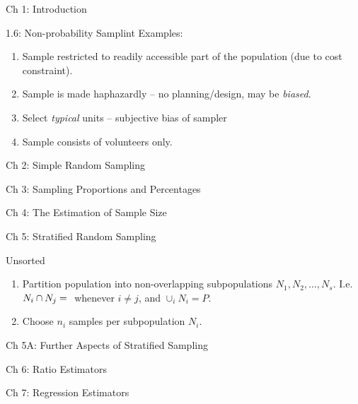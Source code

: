 \documentclass{article}
\begin{document}
\begin{section}{Ch 1: Introduction}
\begin{subsection}{1.6: Non-probability Samplint}
Examples:
\begin{enumerate}
\item Sample restricted to readily accessible part of the population (due
  to cost constraint).
\item Sample is made haphazardly -- no planning/design, may be \emph{biased}.
\item Select \emph{typical} units -- subjective bias of sampler
\item Sample consists of volunteers only.
\end{enumerate}
\end{subsection}
\end{section}

\begin{section}{Ch 2: Simple Random Sampling}
\end{section}

\begin{section}{Ch 3: Sampling Proportions and Percentages}
\end{section}


\begin{section}{Ch 4: The Estimation of Sample Size}
\end{section}

\begin{section}{Ch 5: Stratified Random Sampling}
\begin{subsection}{Unsorted}
\begin{enumerate}
\item Partition population into non-overlapping subpopulations 
  $N_1, N_2, \ldots, N_s$. I.e. $N_i \cap N_j = \null$ whenever $i \neq j$,
  and $\cup_i N_i = P$.
\item Choose $n_i$ samples per subpopulation $N_i$.
\end{enumerate}
\end{subsection}
\end{section}

\begin{section}{Ch 5A: Further Aspects of Stratified Sampling}
\end{section}

\begin{section}{Ch 6: Ratio Estimators}
\end{section}

\begin{section}{Ch 7: Regression Estimators}
\end{section}
\end{document}
